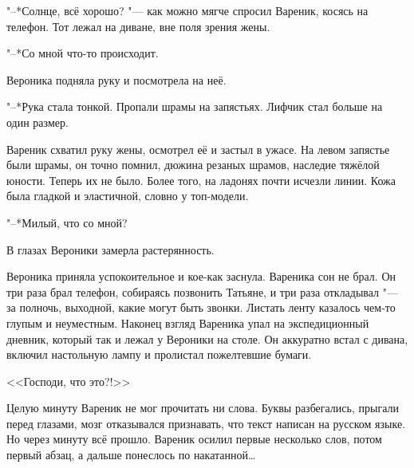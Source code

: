 "--*Солнце, всё хорошо? "--- как можно мягче спросил Вареник, косясь на телефон.
Тот лежал на диване, вне поля зрения жены.

"--*Со мной что-то происходит.

Вероника подняла руку и посмотрела на неё.

"--*Рука стала тонкой.
Пропали шрамы на запястьях.
Лифчик стал больше на один размер.

Вареник схватил руку жены, осмотрел её и застыл в ужасе.
На левом запястье были шрамы, он точно помнил, дюжина резаных шрамов, наследие тяжёлой юности.
Теперь их не было.
Более того, на ладонях почти исчезли линии.
Кожа была гладкой и эластичной, словно у топ-модели.

"--*Милый, что со мной?

В глазах Вероники замерла растерянность.

\asterism

\label{Sun_2012_07_08}

Вероника приняла успокоительное и кое-как заснула.
Вареника сон не брал.
Он три раза брал телефон, собираясь позвонить Татьяне, и три раза откладывал "--- за полночь, выходной, какие могут быть звонки.
Листать ленту казалось чем-то глупым и неуместным.
Наконец взгляд Вареника упал на экспедиционный дневник, который так и лежал у Вероники на столе.
Он аккуратно встал с дивана, включил настольную лампу и пролистал пожелтевшие бумаги.

<<Господи, что это?!>>

Целую минуту Вареник не мог прочитать ни слова.
Буквы разбегались, прыгали перед глазами, мозг отказывался признавать, что текст написан на русском языке.
Но через минуту всё прошло.
Вареник осилил первые несколько слов, потом первый абзац, а дальше понеслось по накатанной\ldots{}



